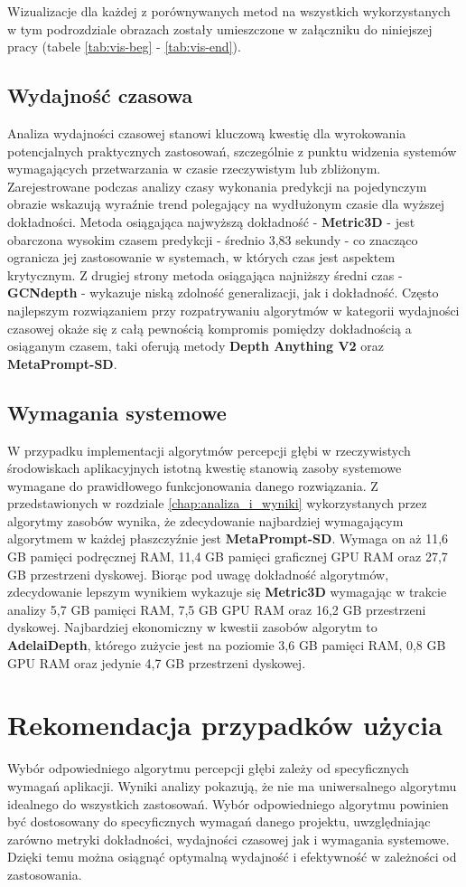 Wizualizacje dla każdej z porównywanych metod na wszystkich wykorzystanych w tym podrozdziale obrazach zostały umieszczone w załączniku do niniejszej pracy (tabele \ref{tab:vis-beg} - \ref{tab:vis-end}).


\subsection{Wydajność czasowa}
Analiza wydajności czasowej stanowi kluczową kwestię dla wyrokowania potencjalnych praktycznych zastosowań, szczególnie z punktu widzenia systemów wymagających przetwarzania w czasie rzeczywistym lub zbliżonym. Zarejestrowane podczas analizy czasy wykonania predykcji na pojedynczym obrazie wskazują wyraźnie trend polegający na wydłużonym czasie dla wyższej dokładności. Metoda osiągająca najwyższą dokładność - \textbf{Metric3D} - jest obarczona wysokim czasem predykcji - średnio 3,83 sekundy - co znacząco ogranicza jej zastosowanie w systemach, w których czas jest aspektem krytycznym. Z drugiej strony metoda osiągająca najniższy średni czas - \textbf{GCNdepth} - wykazuje niską zdolność generalizacji, jak i dokładność. Często najlepszym rozwiązaniem przy rozpatrywaniu algorytmów w kategorii wydajności czasowej okaże się z całą pewnością kompromis pomiędzy dokładnością a osiąganym czasem, taki oferują metody \textbf{Depth Anything V2} oraz \textbf{MetaPrompt-SD}.

\subsection{Wymagania systemowe}
W przypadku implementacji algorytmów percepcji głębi w rzeczywistych środowiskach aplikacyjnych istotną kwestię stanowią zasoby systemowe wymagane do prawidłowego funkcjonowania danego rozwiązania. Z przedstawionych w rozdziale \ref{chap:analiza_i_wyniki} wykorzystanych przez algorytmy zasobów wynika, że zdecydowanie najbardziej wymagającym algorytmem w każdej płaszczyźnie jest \textbf{MetaPrompt-SD}. Wymaga on aż 11,6 GB pamięci podręcznej RAM, 11,4 GB pamięci graficznej GPU RAM oraz 27,7 GB przestrzeni dyskowej. Biorąc pod uwagę dokładność algorytmów, zdecydowanie lepszym wynikiem wykazuje się \textbf{Metric3D} wymagając w trakcie analizy 5,7 GB pamięci RAM, 7,5 GB GPU RAM oraz 16,2 GB przestrzeni dyskowej. Najbardziej ekonomiczny w kwestii zasobów algorytm to \textbf{AdelaiDepth}, którego zużycie jest na poziomie 3,6 GB pamięci RAM, 0,8 GB GPU RAM oraz jedynie 4,7 GB przestrzeni dyskowej.


\section{Rekomendacja przypadków użycia}
Wybór odpowiedniego algorytmu percepcji głębi zależy od specyficznych wymagań aplikacji. Wyniki analizy pokazują, że nie ma uniwersalnego algorytmu idealnego do wszystkich zastosowań. Wybór odpowiedniego algorytmu powinien być dostosowany do specyficznych wymagań danego projektu, uwzględniając zarówno metryki dokładności, wydajności czasowej jak i wymagania systemowe. Dzięki temu można osiągnąć optymalną wydajność i efektywność w zależności od zastosowania.

